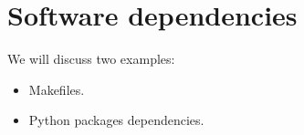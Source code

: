 
\section{Software dependencies}
\begin{publictodo}
    We will discuss two examples:
    \begin{itemize}
        \item
              Makefiles.
        \item Python packages dependencies.
    \end{itemize}
\end{publictodo}

